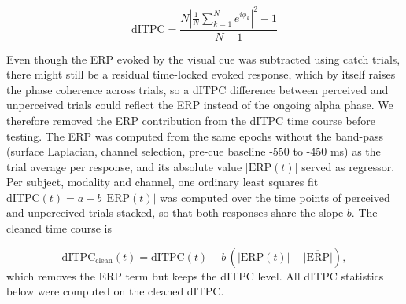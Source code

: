 \documentclass[11pt,a4paper,onecolumn]{article}
\begin{document}
\begin{equation}
	\label{eq:debiased_itpc}
	\mathrm{dITPC}
	=
	\frac{
		N \left|
		\frac{1}{N}\sum_{k=1}^{N} e^{i\phi_k}
		\right|^{2} - 1
	}{N-1}
\end{equation}

Even though the ERP evoked by the visual cue was subtracted using catch trials, there might still be a residual time-locked evoked response, which by itself raises the phase coherence across trials, so a dITPC difference between perceived and unperceived trials could reflect the ERP instead of the ongoing alpha phase. We therefore removed the ERP contribution from the dITPC time course before testing. The ERP was computed from the same epochs without the band-pass (surface Laplacian, channel selection, pre-cue baseline -550 to -450 ms) as the trial average per response, and its absolute value $|\mathrm{ERP}(t)|$ served as regressor. Per subject, modality and channel, one ordinary least squares fit $\mathrm{dITPC}(t) = a + b\,|\mathrm{ERP}(t)|$ was computed over the time points of perceived and unperceived trials stacked, so that both responses share the slope $b$. The cleaned time course is

\begin{equation}
	\label{eq:erp_regression}
	\mathrm{dITPC}_\mathrm{clean}(t) = \mathrm{dITPC}(t) - b\,(|\mathrm{ERP}(t)| - \overline{|\mathrm{ERP}|}),
\end{equation}
which removes the ERP term but keeps the dITPC level. All dITPC statistics below were computed on the cleaned dITPC.
\end{document}
